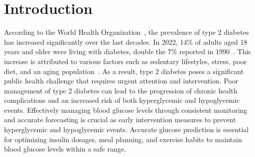 \section{Introduction}
According to the World Health Organization~\cite{abdul2020epidemiology}, the prevalence of type 2 diabetes has increased significantly over the last decades. In 2022, 14\% of adults aged 18 years and older were living with diabetes, double the 7\% reported in 1990~\cite{WHO2024Diabetes}. This increase is attributed to various factors such as sedentary lifestyles, stress, poor diet, and an aging population~\cite{raffin2023sedentary}. As a result, type 2 diabetes poses a significant public health challenge that requires urgent attention and intervention. Poor management of type 2 diabetes can lead to the progression of chronic health complications and an increased risk of both hyperglycemic and hypoglycemic events. Effectively managing blood glucose levels through consistent monitoring and accurate forecasting is crucial as early intervention measures to prevent hyperglycemic and hypoglycemic events. Accurate glucose prediction is essential for optimizing insulin dosages, meal planning, and exercise habits to maintain blood glucose levels within a safe range.




